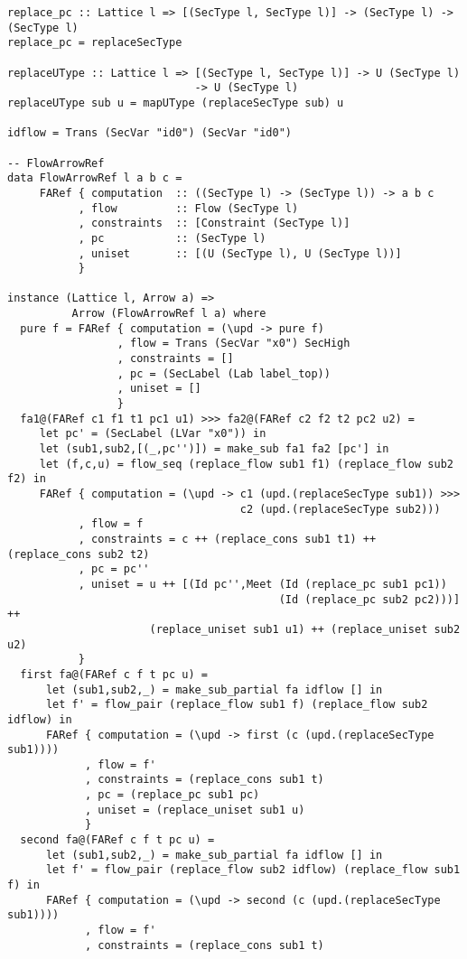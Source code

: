 \begin{Verbatim}[fontsize=\footnotesize,frame=lines,
                 framesep=5mm, label={[FlowArrowRef.hs]FlowArrowRef.hs}]
replace_pc :: Lattice l => [(SecType l, SecType l)] -> (SecType l) -> (SecType l)
replace_pc = replaceSecType

replaceUType :: Lattice l => [(SecType l, SecType l)] -> U (SecType l) 
                             -> U (SecType l)
replaceUType sub u = mapUType (replaceSecType sub) u

idflow = Trans (SecVar "id0") (SecVar "id0")

-- FlowArrowRef
data FlowArrowRef l a b c = 
     FARef { computation  :: ((SecType l) -> (SecType l)) -> a b c
           , flow         :: Flow (SecType l)
           , constraints  :: [Constraint (SecType l)]
           , pc           :: (SecType l)
           , uniset       :: [(U (SecType l), U (SecType l))]
           }

instance (Lattice l, Arrow a) => 
          Arrow (FlowArrowRef l a) where
  pure f = FARef { computation = (\upd -> pure f)
                 , flow = Trans (SecVar "x0") SecHigh
                 , constraints = []
                 , pc = (SecLabel (Lab label_top))
                 , uniset = []
                 }
  fa1@(FARef c1 f1 t1 pc1 u1) >>> fa2@(FARef c2 f2 t2 pc2 u2) =
     let pc' = (SecLabel (LVar "x0")) in
     let (sub1,sub2,[(_,pc'')]) = make_sub fa1 fa2 [pc'] in
     let (f,c,u) = flow_seq (replace_flow sub1 f1) (replace_flow sub2 f2) in
     FARef { computation = (\upd -> c1 (upd.(replaceSecType sub1)) >>> 
                                    c2 (upd.(replaceSecType sub2)))
           , flow = f
           , constraints = c ++ (replace_cons sub1 t1) ++ (replace_cons sub2 t2) 
           , pc = pc''
           , uniset = u ++ [(Id pc'',Meet (Id (replace_pc sub1 pc1)) 
                                          (Id (replace_pc sub2 pc2)))] ++ 
                      (replace_uniset sub1 u1) ++ (replace_uniset sub2 u2)  
           }
  first fa@(FARef c f t pc u) = 
      let (sub1,sub2,_) = make_sub_partial fa idflow [] in
      let f' = flow_pair (replace_flow sub1 f) (replace_flow sub2 idflow) in 
      FARef { computation = (\upd -> first (c (upd.(replaceSecType sub1))))
            , flow = f'
            , constraints = (replace_cons sub1 t)
            , pc = (replace_pc sub1 pc)            
            , uniset = (replace_uniset sub1 u)
            }
  second fa@(FARef c f t pc u) = 
      let (sub1,sub2,_) = make_sub_partial fa idflow [] in
      let f' = flow_pair (replace_flow sub2 idflow) (replace_flow sub1 f) in
      FARef { computation = (\upd -> second (c (upd.(replaceSecType sub1))))
            , flow = f'
            , constraints = (replace_cons sub1 t)

\end{Verbatim}
